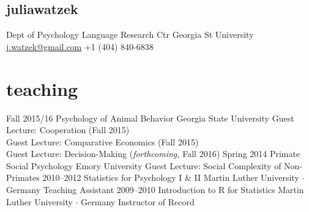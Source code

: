 \documentclass[]{friggeri-cv}
\begin{document}
\begin{aside}
  \section{{\normalfont julia}watzek}
    Dept of Psychology
    Language Research Ctr
    Georgia St University
    ~
    \href{mailto:j.watzek@gmail.com}{j.watzek@gmail.com}
    +1 (404) 840-6838
\end{aside}


\section{teaching}

\begin{entrylist}
  \entry
    {Fall 2015/16}
    {Psychology of Animal Behavior}
    {Georgia State University}
    {Guest Lecture: Cooperation (Fall 2015)\\
    Guest Lecture: Comparative Economics (Fall 2015)\\
    Guest Lecture: Decision-Making (\emph{forthcoming,} Fall 2016)}
  \entry
    {Spring 2014}
    {Primate Social Psychology}
    {Emory University}
    {Guest Lecture: Social Complexity of Non-Primates}
  \entry
    {2010--2012}
    {Statistics for Psychology I \& II}
    {Martin Luther University $\cdot$ Germany}
    {Teaching Assistant}
  \entry
    {2009--2010}
    {Introduction to R for Statistics}
    {Martin Luther University $\cdot$ Germany}
    {Instructor of Record}
\end{entrylist}




\end{document}
